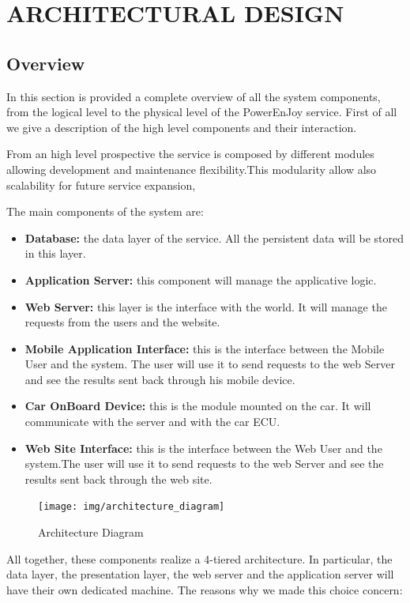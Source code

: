 \section{ARCHITECTURAL DESIGN}
\subsection{Overview} 
In this section is provided a complete overview of all the system components, from the logical level to the physical level of the PowerEnJoy service. First of all we give a description of the high level components and their interaction.\newline

\noindent From an high level prospective the service is composed by different modules allowing development and maintenance flexibility.This modularity allow also scalability for future service expansion,  \newline

\noindent The main components of the system are:
\begin{itemize}
\item{\textbf{Database:}} the data layer of the service. All the persistent data will be stored in this layer.
\item{\textbf{Application Server:}} this component will manage the applicative logic.
\item{\textbf{Web Server:}} this layer is the interface with the world. It will manage the requests from the users and the website.
\item{\textbf{Mobile Application Interface:}} this is the interface between the Mobile User and the system. The user will use it to send requests to the web Server and see the results sent back through his mobile device. 
\item{\textbf{Car OnBoard Device:}} this is the module mounted on the car. It will communicate with the server and with the car ECU.
\item{\textbf{Web Site Interface:}} this is the interface between the Web User and the system.The user will use it to send requests to the web Server and see the results sent back through the web site. 
\end{itemize}

	\begin{figure}[H]	
	\centering
	\texttt{[image: img/architecture\_diagram]}
	\caption{Architecture Diagram}
\end{figure}

All together, these components realize a 4-tiered architecture. In particular, the data layer, the presentation layer, the web server and the application server will have their own dedicated machine. The reasons why we made this choice concern:

